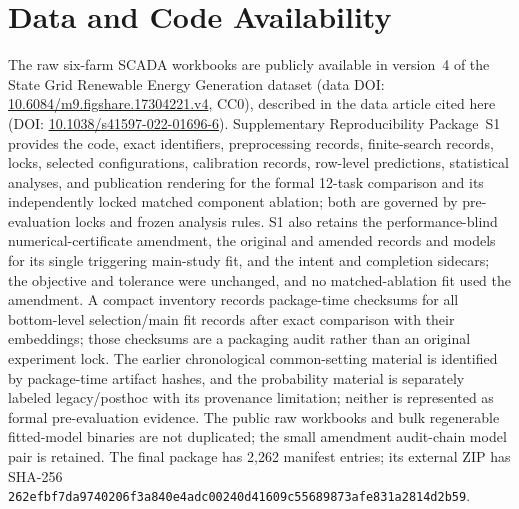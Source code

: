 \section*{Data and Code Availability}
{\color{blue}The raw six-farm SCADA workbooks are publicly available in version~4 of the State Grid Renewable Energy Generation dataset (data DOI: \href{https://doi.org/10.6084/m9.figshare.17304221.v4}{10.6084/m9.figshare.17304221.v4}, CC0), described in the data article cited here (DOI: \href{https://doi.org/10.1038/s41597-022-01696-6}{10.1038/s41597-022-01696-6}). Supplementary Reproducibility Package~S1 provides the code, exact identifiers, preprocessing records, finite-search records, locks, selected configurations, calibration records, row-level predictions, statistical analyses, and publication rendering for the formal 12-task comparison and its independently locked matched component ablation; both are governed by pre-evaluation locks and frozen analysis rules. S1 also retains the performance-blind numerical-certificate amendment, the original and amended records and models for its single triggering main-study fit, and the intent and completion sidecars; the objective and tolerance were unchanged, and no matched-ablation fit used the amendment. A compact inventory records package-time checksums for all bottom-level selection/main fit records after exact comparison with their embeddings; those checksums are a packaging audit rather than an original experiment lock. The earlier chronological common-setting material is identified by package-time artifact hashes, and the probability material is separately labeled legacy/posthoc with its provenance limitation; neither is represented as formal pre-evaluation evidence. The public raw workbooks and bulk regenerable fitted-model binaries are not duplicated; the small amendment audit-chain model pair is retained. The final package has 2,262 manifest entries; its external ZIP has SHA-256 \texttt{262efbf7\allowbreak{}da974020\allowbreak{}6f3a840e\allowbreak{}4adc0024\allowbreak{}0d41609c\allowbreak{}55689873\allowbreak{}afe831a2\allowbreak{}814d2b59}.}
